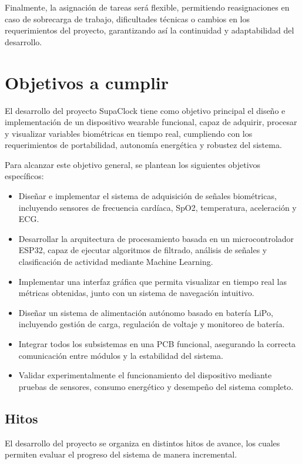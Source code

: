 \documentclass[letterpaper,11pt]{article}
\begin{document}
Finalmente, la asignación de tareas será flexible, permitiendo reasignaciones en caso de sobrecarga de trabajo, dificultades técnicas o cambios en los requerimientos del proyecto, garantizando así la continuidad y adaptabilidad del desarrollo.

\section{Objetivos a cumplir}

El desarrollo del proyecto SupaClock tiene como objetivo principal el diseño e implementación de un dispositivo wearable funcional, capaz de adquirir, procesar y visualizar variables biométricas en tiempo real, cumpliendo con los requerimientos de portabilidad, autonomía energética y robustez del sistema.

Para alcanzar este objetivo general, se plantean los siguientes objetivos específicos:

\begin{itemize}
    \item Diseñar e implementar el sistema de adquisición de señales biométricas, incluyendo sensores de frecuencia cardíaca, SpO2, temperatura, aceleración y ECG.
    \item Desarrollar la arquitectura de procesamiento basada en un microcontrolador ESP32, capaz de ejecutar algoritmos de filtrado, análisis de señales y clasificación de actividad mediante Machine Learning.
    \item Implementar una interfaz gráfica que permita visualizar en tiempo real las métricas obtenidas, junto con un sistema de navegación intuitivo.
    \item Diseñar un sistema de alimentación autónomo basado en batería LiPo, incluyendo gestión de carga, regulación de voltaje y monitoreo de batería.
    \item Integrar todos los subsistemas en una PCB funcional, asegurando la correcta comunicación entre módulos y la estabilidad del sistema.
    \item Validar experimentalmente el funcionamiento del dispositivo mediante pruebas de sensores, consumo energético y desempeño del sistema completo.
\end{itemize}

\subsection{Hitos}

El desarrollo del proyecto se organiza en distintos hitos de avance, los cuales permiten evaluar el progreso del sistema de manera incremental.
\end{document}
